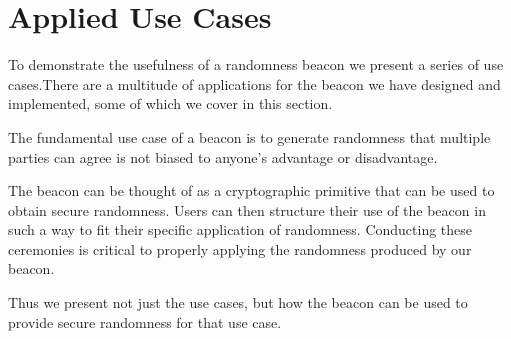 \section{Applied Use Cases}
To demonstrate the usefulness of a randomness beacon we present a series of use cases.There are a multitude of applications for the beacon we have designed and implemented, some of which we cover in this section.

The fundamental use case of a beacon is to generate randomness that multiple parties can agree is not biased to anyone's advantage or disadvantage.

The beacon can be thought of as a cryptographic primitive that can be used to obtain secure randomness. Users can then structure their use of the beacon in such a way to fit their specific application of randomness. Conducting these ceremonies is critical to properly applying the randomness produced by our beacon.

Thus we present not just the use cases, but how the beacon can be used to provide secure randomness for that use case.